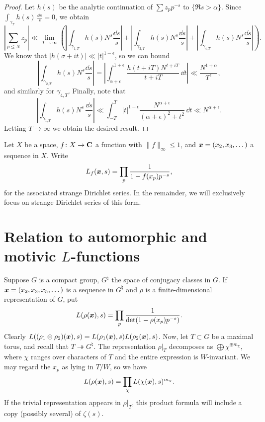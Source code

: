 \begin{proof}
Let $h(s)$ be the analytic continuation of $\sum z_p p^{-s}$ to 
$\{\Re s>\alpha\}$. Since $\int_{\gamma_T} h(s)\, \frac{\dd s}{s}=0$, we obtain 
\[
	\left|\sum_{p\leqslant N} z_p\right| 
		\ll \lim_{T\to \infty} \left(\left| \int_{\gamma_{1,T}} h(s) N^s\frac{\dd s}{s}\right| + \left|\int_{\gamma_{2,T}} h(s) N^s \frac{\dd s}{s}\right| + \left|\int_{\gamma_{4,T}} h(s) N^s \frac{\dd s}{s}\right| \right).
\]
We know that $|h(\sigma+i t)| \ll |t|^{1-\epsilon}$, so we can bound 
\[
	\left| \int_{\gamma_{2,T}} h(s)N^s \frac{\dd s}{s}\right| = \left| \int_{\alpha+\epsilon}^{1+\epsilon} \frac{h(t+i T) N^{t+i T}}{t+i T}\, \dd t\right| \ll \frac{N^{1+\alpha}}{T^\epsilon} ,
\]
and similarly for $\gamma_{4,T}$. Finally, note that 
\[
	\left| \int_{\gamma_{1,T}} h(s) N^s\, \frac{\dd s}{s}\right| \ll \int_{-T}^T |t|^{1-\epsilon} \frac{N^{\alpha+\epsilon}}{(\alpha+\epsilon)^2 + t^2} \, \dd t \ll N^{\alpha+\epsilon} .
\]
Letting $T\to \infty$ we obtain the desired result. 
\end{proof}

Let $X$ be a space, $f\colon X\to \mathbf{C}$ a function with 
$\|f\|_\infty\leqslant 1$, and ${\boldsymbol x}=(x_2,x_3,\dots)$ a sequence in $X$. Write 
\[
	L_f({\boldsymbol x},s) = \prod_p \frac{1}{1-f(x_p) p^{-s}} ,
\]
for the associated strange Dirichlet series. In the remainder, we will 
exclusively focus on strange Dirichlet series of this form. 





\section{Relation to automorphic and motivic \texorpdfstring{$L$}{L}-functions}

Suppose $G$ is a compact group, $G^\natural$ the space of conjugacy classes in 
$G$. If ${\boldsymbol x} = (x_2,x_3,x_5,\dots)$ is a sequence in $G^\natural$ and $\rho$ is 
a finite-dimensional representation of $G$, put 
\[
	L(\rho({\boldsymbol x}),s) = \prod_p \frac{1}{\det(1-\rho(x_p) p^{-s})} .
\]
Clearly $L((\rho_1\oplus \rho_2)({\boldsymbol x}),s) = L(\rho_1({\boldsymbol x}),s) L(\rho_2({\boldsymbol x}),s)$. 
Now, let $T\subset G$ be a maximal torus, and recall that 
$T\twoheadrightarrow G^\natural$. The representation 
$\left.\rho\right|_T$ decomposes as $\bigoplus \chi^{\oplus m_\chi}$, where 
$\chi$ ranges over characters of $T$ and the entire expression is 
$W$-invariant. We may regard the $x_p$ as lying in $T/W$, so we have 
\[
	L(\rho({\boldsymbol x}),s) = \prod_\chi L(\chi({\boldsymbol x}),s)^{m_\chi} .
\]
If the trivial representation appears in $\left.\rho\right|_T$, this product 
formula will include a copy (possibly several) of $\zeta(s)$. 





